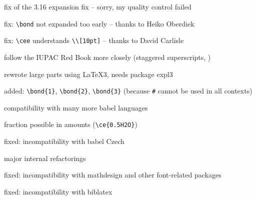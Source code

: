 \documentclass[a4paper,notitlepage]{scrreprt}
\begin{document}
\begin{compactitem}
\item fix of the 3.16 expansion fix -- sorry, my quality control failed 
\end{compactitem}

\begin{compactitem}
\item fix: \verb|\bond| not expanded too early -- thanks to Heiko Oberdiek
\item fix: \verb|\cee| understands \verb|\\[10pt]| -- thanks to David Carlisle
\end{compactitem}

\begin{compactitem}
\item follow the IUPAC Red Book more closely (staggered superscripts, ) 
\item rewrote large parts using \LaTeX3, needs package expl3
\item added: \verb|\bond{1}|, \verb|\bond{2}|, \verb|\bond{3}| (because \verb|#| cannot be used in all contexts)
\end{compactitem}

\begin{compactitem}
\item compatibility with many more babel languages
\item fraction possible in amounts (\verb|\ce{0.5H2O}|)
\end{compactitem}

\begin{compactitem}
\item fixed: incompatibility with babel Czech
\item major internal refactorings
\end{compactitem}

\begin{compactitem}
\item fixed: incompatibility with mathdesign and other font-related packages
\end{compactitem}

\begin{compactitem}
\item fixed: incompatibility with biblatex
\end{compactitem}
\end{document}
